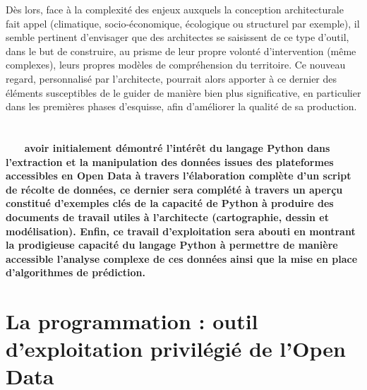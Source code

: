 \documentclass[
  11pt,
  french,
]{article}
\begin{document}
Dès lors, face à la complexité des enjeux auxquels la conception
architecturale fait appel (climatique, socio-économique, écologique ou
structurel par exemple), il semble pertinent d'envisager que des
architectes se saisissent de ce type d'outil, dans le but de construire,
au prisme de leur propre volonté d'intervention (même complexes), leurs
propres modèles de compréhension du territoire. Ce nouveau regard,
personnalisé par l'architecte, pourrait alors apporter à ce dernier des
éléments susceptibles de le guider de manière bien plus significative,
en particulier dans les premières phases d'esquisse, afin d'améliorer la
qualité de sa production.\\
~\\
~\\
\bfseries\color{red}{Ainsi, dans quelle mesure l’exploitation de données issues de l’Open Data grâce au langage Python représente-t-elle un avantage certain pour l’architecte ?}
\
\newline
\newline
\
\normalfont\color{black}{Après} avoir initialement démontré l’intérêt du langage Python dans l’extraction et la manipulation des données issues des plateformes accessibles en Open Data à travers l’élaboration complète d’un script de récolte de données, ce dernier sera complété à travers un aperçu constitué d’exemples clés de la capacité de Python à produire des documents de travail utiles à l’architecte (cartographie, dessin et modélisation). Enfin, ce travail d’exploitation sera abouti en montrant la prodigieuse capacité du langage Python à permettre de manière accessible l’analyse complexe de ces données ainsi que la mise en place d’algorithmes de prédiction.

\newpage

\hypertarget{la-programmation-outil-dexploitation-priviluxe9giuxe9-de-lopen-data}{%
\section{La programmation : outil d'exploitation privilégié de l'Open
Data}\label{la-programmation-outil-dexploitation-priviluxe9giuxe9-de-lopen-data}}
\end{document}
